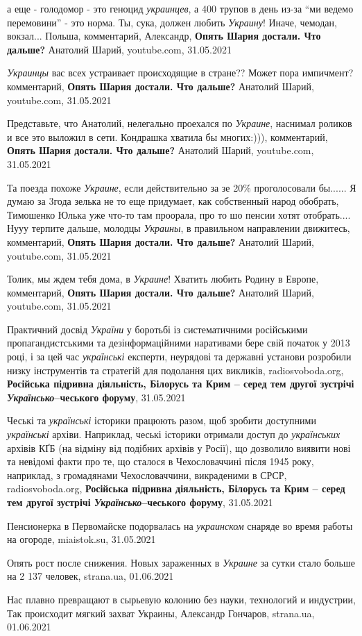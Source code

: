 а еще - голодомор - это геноцид \emph{украинцев}, а 400 трупов в день из-за \enquote{ми ведемо
перемовини} - это норма. Ты, сука, должен любить \emph{Украину}! Иначе, чемодан,
вокзал... Польша,
комментарий, Александр, \textbf{Опять Шария достали. Что дальше?} Анатолий Шарий, youtube.com, 31.05.2021

\emph{Украинцы} вас всех устраивает происходящие в стране?? Может пора импичмент?
комментарий, \textbf{Опять Шария достали. Что дальше?} Анатолий Шарий, youtube.com, 31.05.2021

Представьте, что Анатолий, нелегально проехался по \emph{Украине}, наснимал роликов и все это выложил в сети. Кондрашка хватила бы многих:))),
комментарий, \textbf{Опять Шария достали. Что дальше?} Анатолий Шарий, youtube.com, 31.05.2021

Та поезда похоже \emph{Украине}, если действительно за зе 20\% проголосовали бы...... Я
думаю за 3года зелька не то еще придумает, как собственный народ обобрать,
Тимошенко Юлька уже что-то там проорала, про то шо пенсии хотят отобрать....
Нууу терпите дальше, молодцы \emph{Украины}, в правильном направлении движитесь,
комментарий, \textbf{Опять Шария достали. Что дальше?} Анатолий Шарий, youtube.com, 31.05.2021

Толик, мы ждем тебя дома, в \emph{Украине}! Хватить любить Родину в Европе,
комментарий, \textbf{Опять Шария достали. Что дальше?} Анатолий Шарий, youtube.com, 31.05.2021

Практичний досвід \emph{України} у боротьбі із систематичними російськими
пропагандистськими та дезінформаційними наративами бере свій початок у 2013
році, і за цей час \emph{українські} експерти, неурядові та державні установи
розробили низку інструментів та стратегій для подолання цих викликів,
radiosvoboda.org, \textbf{Російська підривна діяльність, Білорусь та Крим –
серед тем другої зустрічі \emph{Українсько}–чеського форуму}, 31.05.2021

Чеські та \emph{українські} історики працюють разом, щоб зробити доступними
\emph{українські} архіви. Наприклад, чеські історики отримали доступ до
\emph{українських} архівів КҐБ (на відміну від подібних архівів у Росії), що
дозволило виявити нові та невідомі факти про те, що сталося в Чехословаччині
після 1945 року, наприклад, з громадянами Чехословаччини, викраденими в СРСР, 
radiosvoboda.org, \textbf{Російська підривна діяльність, Білорусь та Крим –
серед тем другої зустрічі \emph{Українсько}–чеського форуму}, 31.05.2021

Пенсионерка в Первомайске подорвалась на \emph{украинском} снаряде во время работы на огороде,
miaistok.su, 31.05.2021

Опять рост после снижения. Новых зараженных в \emph{Украине} за сутки стало
больше на 2 137 человек, strana.ua, 01.06.2021

Нас плавно превращают в сырьевую колонию без науки, технологий и индустрии, Так
происходит мягкий захват Украины, Александр Гончаров, strana.ua, 01.06.2021

